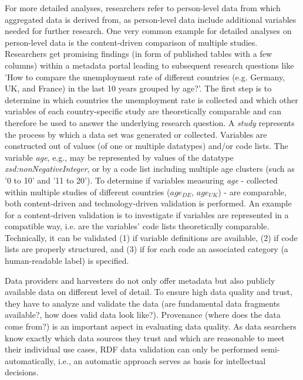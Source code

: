 \documentclass{llncs}
\begin{document}
For more detailed analyses, researchers refer to person-level data from which aggregated data is derived from, 
as person-level data include additional variables needed for further research.
One very common example for detailed analyses on person-level data is the content-driven comparison of multiple studies.
Researchers get promising findings (in form of published tables with a few columns) within a metadata portal leading to subsequent research questions 
like 'How to compare the unemployment rate of different countries (e.g. Germany, UK, and France) in the last 10 years grouped by age?'.
The first step is to determine in which countries the unemployment rate is collected and which other variables of each country-specific study are theoretically comparable and can therefore be used to answer the underlying research question.
A \emph{study} represents the process by which a data set was generated or collected.
Variables are constructed out of values (of one or multiple datatypes) and/or code lists.
The variable \emph{age}, e.g., may be represented by values of the datatype \emph{xsd:nonNegativeInteger}, or by a code list including multiple age clusters (such as '0 to 10' and '11 to 20'). 
To determine if variables measuring \emph{age} 
- collected within multiple studies of different countries (\emph{$age_{DE}$}, \emph{$age_{UK}$}) - 
are comparable, both content-driven and technology-driven validation is performed.
An example for a content-driven validation is to investigate if variables are represented in a compatible way,
i.e. are the variables' code lists theoretically comparable.
Technically, it can be validated (1) if variable definitions are available, (2) if code lists are properly structured, and (3) if for each code an associated category (a human-readable label) is specified.

Data providers and harvesters do not only offer metadata but also publicly available data on different level of detail.
To ensure high data quality and trust, they have to analyze and validate the data (are fundamental data fragments available?, how does valid data look like?). 
Provenance (where does the data come from?) is an important aspect in evaluating data quality.
As data searchers know exactly which data sources they trust and which are reasonable to meet their individual use cases, 
RDF data validation can only be performed semi-automatically, i.e., an automatic approach serves as basis for intellectual decisions. 
\end{document}
